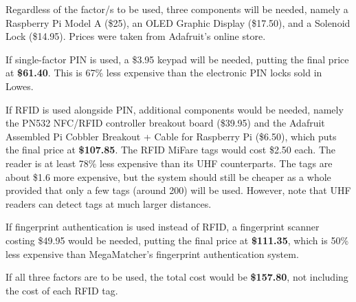 Regardless of the factor/s to be used, three components will be needed, namely a Raspberry Pi Model A (\$25), an OLED Graphic Display (\$17.50), and a Solenoid Lock (\$14.95). Prices were taken from Adafruit's online store.

If single-factor PIN is used, a \$3.95 keypad will be needed, putting the final price at \textbf{\$61.40}. This is 67\% less expensive than the electronic PIN locks sold in Lowes.

If RFID is used alongside PIN, additional components would be needed, namely the PN532 NFC/RFID controller breakout board (\$39.95) and the Adafruit Assembled Pi Cobbler Breakout + Cable for Raspberry Pi (\$6.50), which puts the final price at \textbf{\$107.85}. The RFID MiFare tags would cost \$2.50 each. The reader is at least 78\% less expensive than its UHF counterparts. The tags are about \$1.6 more expensive, but the system should still be cheaper as a whole provided that only a few tags (around 200) will be used. However, note that UHF readers can detect tags at much larger distances.

If fingerprint authentication is used instead of RFID, a fingerprint scanner costing \$49.95 would be needed, putting the final price at \textbf{\$111.35}, which is 50\% less expensive than MegaMatcher's fingerprint authentication system.

If all three factors are to be used, the total cost would be \textbf{\$157.80}, not including the cost of each RFID tag.